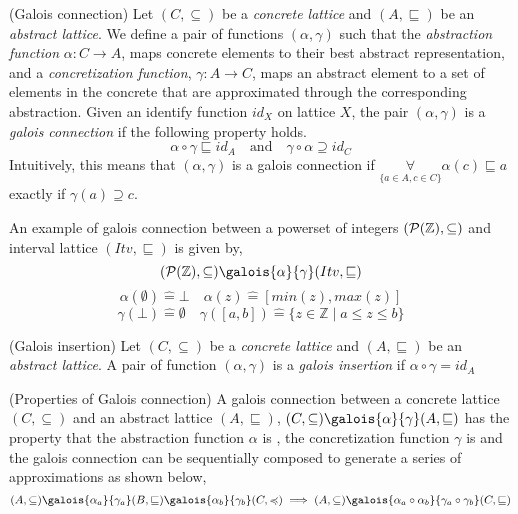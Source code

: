 %
\begin{definition} (Galois connection)
  Let $(C, \subseteq)$ be a \emph{concrete lattice} and $(A, \sqsubseteq)$ 
  be an \emph{abstract lattice}. We define a pair of functions $(\alpha,\gamma)$ 
  such that the \emph{abstraction function} $\alpha \colon C \rightarrow A$, maps
  concrete elements to their best abstract representation, and a \emph{concretization 
  function}, $\gamma \colon A \rightarrow C$, maps an abstract element to a set
  of elements in the concrete that are approximated through the corresponding
  abstraction. Given an identify function $id_X$ on lattice $X$, the pair 
  $(\alpha,\gamma)$ is a \emph{galois connection} if the following property holds. 
  \[
     \alpha \circ \gamma \sqsubseteq id_A \quad \text{and} \quad 
     \gamma \circ \alpha \supseteq id_C
  \]
  Intuitively, this means that $(\alpha,\gamma)$ is a galois connection if 
  $\underset{\{a \in A,c \in C\}}{\forall} \alpha(c) \sqsubseteq a$ exactly if $\gamma(a)
  \supseteq c$.
\end{definition}
%
\begin{example}
  An example of galois connection between a powerset of integers
  $(\mathcal{P}(\mathbb{Z}), \subseteq)$ and interval lattice $(Itv,\sqsubseteq)$ is given
  by,
\[
  (\powerset(\mathbb{Z}),\subseteq)
    \galois{\alpha}{\gamma}
  (Itv,\sqsubseteq)
\]
\[
  \alpha(\emptyset) \mathrel{\hat=} \bot \quad \alpha(z) \mathrel{\hat=}
  [min(z), max(z)]
\]
\[
  \gamma(\bot) \mathrel{\hat=} \emptyset \quad \gamma([a,b]) \mathrel{\hat=} \{z
  \in \mathbb{Z} \mid a \leq z \leq b\}
\]
\end{example}
%
\begin{definition} (Galois insertion)
  Let $(C, \subseteq)$ be a \emph{concrete lattice} and $(A, \sqsubseteq)$ 
  be an \emph{abstract lattice}. A pair of function $(\alpha,\gamma)$ 
  is a \emph{galois insertion} if $\alpha \circ \gamma = id_A$
\end{definition}  
%
\begin{definition} (Properties of Galois connection)
A galois connection between a concrete lattice $(C, \subseteq)$ and an abstract 
lattice $(A, \sqsubseteq)$, 
  $(C,\subseteq) \galois{\alpha}{\gamma} (A,\sqsubseteq)$ has the property that
  the abstraction function $\alpha$ is , the concretization function
  $\gamma$ is  and the galois connection can be
  sequentially composed to generate a series of approximations as shown below, 
  \[
    (A,\subseteq)
    \galois{\alpha_a}{\gamma_a}
    (B,\sqsubseteq)
    \galois{\alpha_b}{\gamma_b}
    (C,\preccurlyeq) 
    \implies 
    (A,\subseteq)
    \galois{\alpha_a \circ \alpha_b}{\gamma_a \circ \gamma_b}
    (C,\sqsubseteq)
  \]
\end{definition}  
